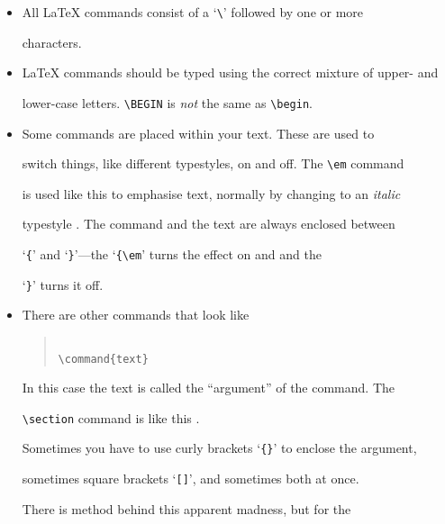 \begin{itemize}



\item All \LaTeX{} commands consist of a `\verb|\|' followed by one or more

characters.



\item \LaTeX{} commands should be typed using the correct mixture of upper- and

lower-case letters.  \verb|\BEGIN| is {\em not\/} the same as \verb|\begin|.



\item Some commands are placed within your text.  These are used to

switch things, like different typestyles, on and off. The \verb|\em| command

is used like this to emphasise text, normally by changing to an {\it italic\/}

typestyle .  The command and the text are always enclosed between

`\verb|{|' and `\verb|}|'---the `\verb|{\em|' turns the effect on and and the

`\verb|}|' turns it off.



\item There are other commands that look like

\begin{quote}\begin{verbatim}

\command{text}

\end{verbatim}\end{quote}

In this case the text is called the ``argument'' of the command.  The

\verb|\section| command is like this .

Sometimes you have to use curly brackets `\verb|{}|' to enclose the argument,

sometimes square brackets `\verb|[]|', and sometimes both at once.

There is method behind this apparent madness, but for the


\end{itemize}
